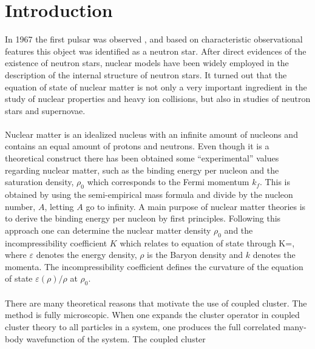 \chapter{Introduction}
In 1967 the first
pulsar was observed \cite{nat:hewish}, and based on characteristic
observational features this object was identified as a neutron star. After
direct evidences of the existence of neutron stars, nuclear models have been widely
employed in the description of the internal structure of neutron stars. It 
turned out that the equation of state of nuclear matter is not only a very 
important ingredient in the study of nuclear properties and heavy ion 
collisions, but also in studies of neutron stars and supernovae.\\
\\
Nuclear matter is an idealized nucleus with an infinite amount of nucleons
and contains an equal amount of protons and neutrons. Even though it is a
theoretical construct there has been obtained some ``experimental'' values
regarding nuclear matter, such as the binding energy per nucleon and the saturation density, $\rho_0$ which
corresponds to the Fermi momentum $k_f$. This is obtained by using the semi-empirical mass formula and divide
by the nucleon number, $A$, letting
$A$ go to infinity. A main purpose of nuclear matter theories is to derive the 
binding energy per nucleon by first principles. Following this approach one can determine the nuclear matter density $\rho_0$ and the incompressibility coefficient $K$ which relates to equation of state through
\beq
K=,
\eeq
where $\varepsilon$ denotes the energy density, $\rho$ is the Baryon density 
and $k$ denotes the momenta. The incompressibility coefficient defines the 
curvature of the equation of state $\varepsilon(\rho)/\rho$ at $\rho_0$.\\ 
\\
There are many theoretical reasons that motivate the use of coupled cluster. The
method is fully microscopic. When one expands the cluster operator in coupled cluster theory to all particles in a system, one produces the full correlated many-body wavefunction of the system.  The coupled cluster 
